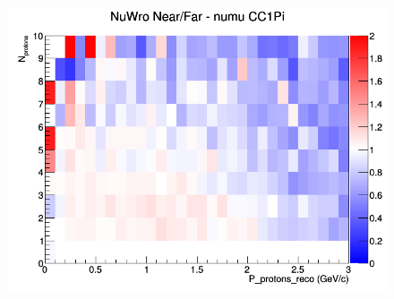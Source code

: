 \begin{figure}[h]
\endminipage
{}
\includegraphics[width=\linewidth]{eff_N_P/LAr/protons/ratios/CC1Pi_NuWro_numu_NF_N_P.png}
\endminipage
\newline
\end{figure}
\clearpage
